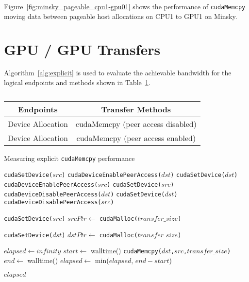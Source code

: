 Figure~\ref{fig:minsky_pageable_cpu1-gpu01} shows the performance of \texttt{cudaMemcpy} moving data between pageable host allocations on CPU1 to GPU1 on Minsky.

\section{GPU / GPU Transfers}


Algorithm~\ref{alg:explicit} is used to evaluate the achievable bandwidth for the logical endpoints and methods shown in Table~\ref{tab:explicit}.

\begin{table}[ht]
    \centering
    \caption[]{}
    \label{tab:explicit}
    \begin{tabular}{|c|c|}
    \hline
    \textbf{Endpoints} & \textbf{Transfer Methods} \\ \hline 
    Device Allocation & cudaMemcpy (peer access disabled) \\ \hline
    Device Allocation & cudaMemcpy (peer access enabled) \\ \hline
    \end{tabular}
\end{table}

\begin{algorithm}
    \caption{Measuring explicit \texttt{cudaMemcpy} performance}
    \label{alg:explicit}
    \begin{algorithmic}[1]
    \Statex
            \State \texttt{cudaSetDevice($src$)}
            \State \texttt{cudaDeviceEnablePeerAccess($dst$)}
            \State \texttt{cudaSetDevice($dst$)}
            \State \texttt{cudaDeviceEnablePeerAccess($src$)}
        \Else
            \State \texttt{cudaSetDevice($src$)}
            \State \texttt{cudaDeviceDisablePeerAccess($dst$)}
            \State \texttt{cudaSetDevice($dst$)}
            \State \texttt{cudaDeviceDisablePeerAccess($src$)}        
        \EndIf

        \State \texttt{cudaSetDevice($src$)} 
        \State $srcPtr \gets$ \texttt{cudaMalloc($transfer\_size$)}

        \State \texttt{cudaSetDevice($dst$)} 
        \State $dstPtr \gets$ \texttt{cudaMalloc($transfer\_size$)}

        \State $elapsed \gets infinity$ 
            \State $start \gets$ walltime()
            \State \texttt{cudaMemcpy($dst$,$src$,$transfer\_size$)}
            \State $end \gets$ walltime()
            \State $elapsed \gets$ min($elapsed$, $end-start$)
        \EndFor

    \Return $elapsed$
    \EndFunction

    \end{algorithmic}
\end{algorithm}



